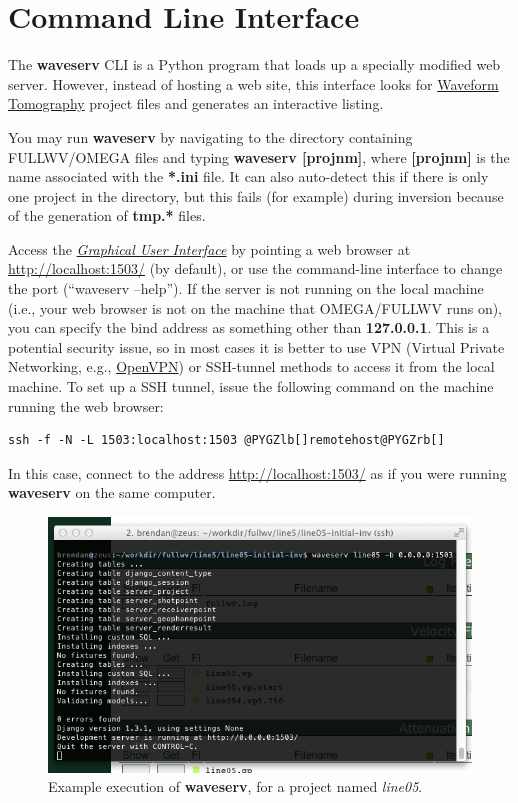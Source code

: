 \documentclass[letterpaper,10pt,english]{sphinxmanual}
\begin{document}
\chapter{Command Line Interface}
\label{cli:command-line-interface}\label{cli::doc}\label{cli:cli}
The \textbf{waveserv} CLI is a Python program that loads up a specially modified web server.  However, instead of hosting a web site, this interface looks for \href{http://orion.es.uwo.ca/index.php/Waveform\_Tomography}{Waveform Tomography} project files and generates an interactive listing.

You may run \textbf{waveserv} by navigating to the directory containing FULLWV/OMEGA files and typing \textbf{waveserv {[}projnm{]}}, where \textbf{{[}projnm{]}} is the name associated with the \textbf{*.ini} file.  It can also auto-detect this if there is only one project in the directory, but this fails (for example) during inversion because of the generation of \textbf{tmp.*} files.

Access the {\hyperref[gui:gui]{\emph{Graphical User Interface}}} by pointing a web browser at \href{http://localhost:1503/}{http://localhost:1503/} (by default), or use the command-line interface to change the port (``waveserv --help'').  If the server is not running on the local machine (i.e., your web browser is not on the machine that OMEGA/FULLWV runs on), you can specify the bind address as something other than \textbf{127.0.0.1}.  This is a potential security issue, so in most cases it is better to use VPN (Virtual Private Networking, e.g., \href{http://openvpn.net/}{OpenVPN}) or SSH-tunnel methods to access it from the local machine.  To set up a SSH tunnel, issue the following command on the machine running the web browser:

\begin{Verbatim}[commandchars=@\[\]]
ssh -f -N -L 1503:localhost:1503 @PYGZlb[]remotehost@PYGZrb[]
\end{Verbatim}

In this case, connect to the address \href{http://localhost:1503/}{http://localhost:1503/} as if you were running \textbf{waveserv} on the same computer.
\begin{figure}[htbp]
\centering
\capstart

\includegraphics{startcmd9.png}
\caption{Example execution of \textbf{waveserv}, for a project named \emph{line05}.}\end{figure}
\end{document}
